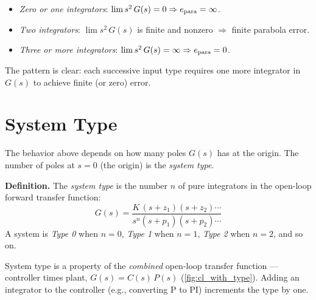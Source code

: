 \documentclass[../../book.tex]{subfiles}
\begin{document}
\begin{itemize}
  \item \emph{Zero or one integrators}: $\lim s^2\,G(s) = 0 \Rightarrow
    e_{\rm para} = \infty$.
  \item \emph{Two integrators}: $\lim s^2\,G(s)$ is finite and nonzero
    $\Rightarrow$ finite parabola error.
  \item \emph{Three or more integrators}: $\lim s^2\,G(s) = \infty \Rightarrow
    e_{\rm para} = 0$.
\end{itemize}

The pattern is clear: each successive input type requires one more integrator in
$G(s)$ to achieve finite (or zero) error.

\section{System Type}
\label{sec:system_type}

The behavior above depends on how many poles $G(s)$ has at the
origin.  The number of poles at $s = 0$ (the origin) is the \emph{system type}.

\textbf{Definition.}  The \emph{system type} is the number $n$ of pure
integrators in the open-loop forward transfer function:
\begin{equation}
  G(s) = \frac{K\,(s + z_1)(s + z_2)\cdots}{s^n(s + p_1)(s + p_2)\cdots}
  \label{eq:G_form}
\end{equation}
A system is \emph{Type 0} when $n = 0$, \emph{Type 1} when $n = 1$,
\emph{Type 2} when $n = 2$, and so on.

System type is a property of the \emph{combined} open-loop transfer function ---
controller times plant, $G(s) = C(s)\,P(s)$ (\cref{fig:cl_with_type}).  Adding
an integrator to the controller (e.g., converting P to PI) increments the type
by one.
\end{document}

